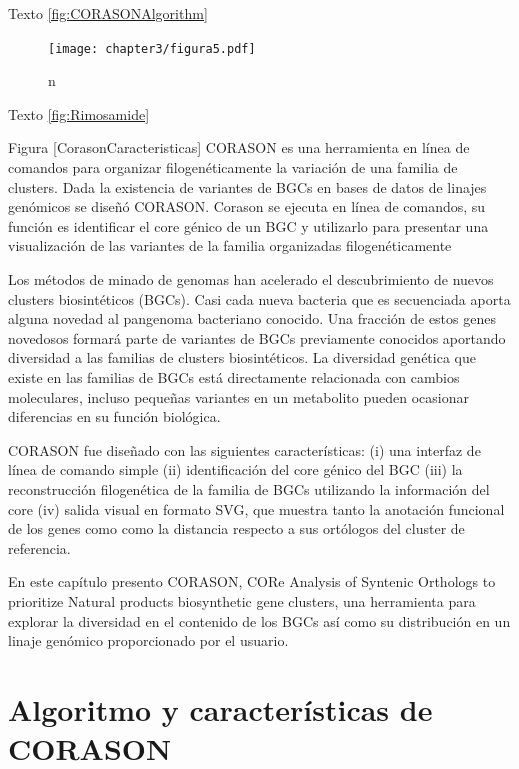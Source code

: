 \documentclass[12pt,twoside]{reedthesis}
\begin{document}
  Texto \autoref{fig:CORASONAlgorithm}
  
  \begin{figure}[h!tbp]
  \centering
  \texttt{[image: chapter3/figura5.pdf]}
  \caption[EvoMining Algorithm]{\footnotesize{n}}
  \label{fig:Rimosamide}
  \end{figure}
  
  Texto \autoref{fig:Rimosamide}
  
  Figura {[}CorasonCaracteristicas{]} CORASON es una herramienta en línea
  de comandos para organizar filogenéticamente la variación de una familia
  de clusters. Dada la existencia de variantes de BGCs en bases de datos
  de linajes genómicos se diseñó CORASON. Corason se ejecuta en línea de
  comandos, su función es identificar el core génico de un BGC y
  utilizarlo para presentar una visualización de las variantes de la
  familia organizadas filogenéticamente
  
  Los métodos de minado de genomas han acelerado el descubrimiento de
  nuevos clusters biosintéticos (BGCs). Casi cada nueva bacteria que es
  secuenciada aporta alguna novedad al pangenoma bacteriano conocido. Una
  fracción de estos genes novedosos formará parte de variantes de BGCs
  previamente conocidos aportando diversidad a las familias de clusters
  biosintéticos. La diversidad genética que existe en las familias de BGCs
  está directamente relacionada con cambios moleculares, incluso pequeñas
  variantes en un metabolito pueden ocasionar diferencias en su función
  biológica.
  
  CORASON fue diseñado con las siguientes características: (i) una
  interfaz de línea de comando simple (ii) identificación del core génico
  del BGC (iii) la reconstrucción filogenética de la familia de BGCs
  utilizando la información del core (iv) salida visual en formato SVG,
  que muestra tanto la anotación funcional de los genes como como la
  distancia respecto a sus ortólogos del cluster de referencia.
  
  En este capítulo presento CORASON, CORe Analysis of Syntenic Orthologs
  to prioritize Natural products biosynthetic gene clusters, una
  herramienta para explorar la diversidad en el contenido de los BGCs así
  como su distribución en un linaje genómico proporcionado por el usuario.
  
  \section{Algoritmo y características de
  CORASON}\label{algoritmo-y-caracteristicas-de-corason}
  
\end{document}
